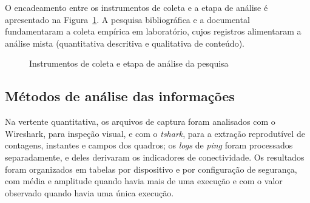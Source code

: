 O encadeamento entre os instrumentos de coleta e a etapa de análise é apresentado na Figura~\ref{fig:fluxo_instrumentos}. A pesquisa bibliográfica e a documental fundamentaram a coleta empírica em laboratório, cujos registros alimentaram a análise mista (quantitativa descritiva e qualitativa de conteúdo).

\begin{figure}[htb]
\centering
\caption{Instrumentos de coleta e etapa de análise da pesquisa}
\label{fig:fluxo_instrumentos}
\end{figure}

\subsection{Métodos de análise das informações}

Na vertente quantitativa, os arquivos de captura foram analisados com o Wireshark, para inspeção visual, e com o \textit{tshark}, para a extração reprodutível de contagens, instantes e campos dos quadros; os \textit{logs} de \textit{ping} foram processados separadamente, e deles derivaram os indicadores de conectividade. Os resultados foram organizados em tabelas por dispositivo e por configuração de segurança, com média e amplitude quando havia mais de uma execução e com o valor observado quando havia uma única execução.

